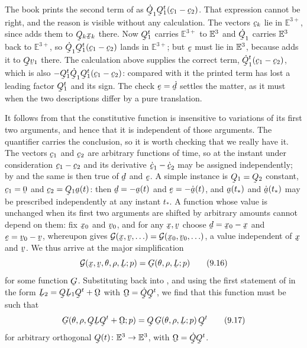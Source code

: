 \begin{remark}\label{rem:ch9mis14}
The book prints the second term of  as
$\dot\bQ_{1}\bQ_{1}^{t}(\bc_{1}-\bc_{2})$. That expression cannot be
right, and the reason is visible without any calculation. The vectors
$\bc_{k}$ lie in $\mathbb{E}^{3+}$, since  adds them to
$\bQ_{k}\bx_{k}$ there. Now $\bQ_{1}^{t}$ carries $\mathbb{E}^{3+}$ to
$\mathbb{E}^{3}$ and $\dot\bQ_{1}$ carries $\mathbb{E}^{3}$ back to $\mathbb{E}^{3+}$, so
$\dot\bQ_{1}\bQ_{1}^{t}(\bc_{1}-\bc_{2})$ lands in $\mathbb{E}^{3+}$;
but $\be$ must lie in $\mathbb{E}^{3}$, because  adds it to $\bQ\bv_{1}$
there. The calculation above supplies the correct term,
$\dot\bQ_{1}^{t}(\bc_{1}-\bc_{2})$, which is also
$-\bQ_{1}^{t}\dot\bQ_{1}\bQ_{1}^{t}(\bc_{1}-\bc_{2})$: compared with it
the printed term has lost a leading factor $\bQ_{1}^{t}$ and its sign.
The check $\be=\dot\bd$ settles the matter, as it must when the two
descriptions differ by a pure translation.
\end{remark}

It follows from  that the constitutive function is insensitive
to variations of its first two arguments, and hence that it is
independent of those arguments. The quantifier carries the conclusion,
so it is worth checking that we really have it. The vectors $\bc_{1}$
and $\bc_{2}$ are arbitrary functions of time, so at the instant under
consideration $\bc_{1}-\bc_{2}$ and its derivative
$\dot\bc_{1}-\dot\bc_{2}$ may be assigned independently; by 
and  the same is then true of $\bd$ and $\be$. A simple
instance is $\bQ_{1}=\bQ_{2}$ constant, $\bc_{1}=\bze$ and
$\bc_{2}=\bQ_{1}\ba(t)$: then $\bd=-\ba(t)$ and $\be=-\dot\ba(t)$, and
$\ba(t_{*})$ and $\dot\ba(t_{*})$ may be prescribed independently at
any instant $t_{*}$. A function whose value is unchanged when its first
two arguments are shifted by arbitrary amounts cannot depend on them:
fix $\bx_{0}$ and $\bv_{0}$, and for any $\bx,\bv$ choose
$\bd=\bx_{0}-\bx$ and $\be=\bv_{0}-\bv$, whereupon  gives
$\mathcal{G}(\bx,\bv,\ldots)=\mathcal{G}(\bx_{0},\bv_{0},\ldots)$, a
value independent of $\bx$ and $\bv$. We thus arrive at the major
simplification
\begin{equation}
   \mathcal{G}(\bx,\bv,\theta,\rho,\bL;p)=\bG(\theta,\rho,\bL;p)
   \tag{9.16}\label{eq:9.16}
\end{equation}
for some function $\bG$. Substituting back into , and using
the first statement of  in the form $\bL_{2}=\bQ\bL_{1}
\bQ^{t}+\bOm$ with $\bOm=\dot\bQ\bQ^{t}$, we find that this function
must be such that
\begin{equation}
   \bG(\theta,\rho,\bQ\bL\bQ^{t}+\bOm;p)
   =\bQ\,\bG(\theta,\rho,\bL;p)\,\bQ^{t}
   \tag{9.17}\label{eq:9.17}
\end{equation}
for arbitrary orthogonal $\bQ(t)\colon\Vt\to\Vt$, with
$\bOm=\dot\bQ\bQ^{t}$.

